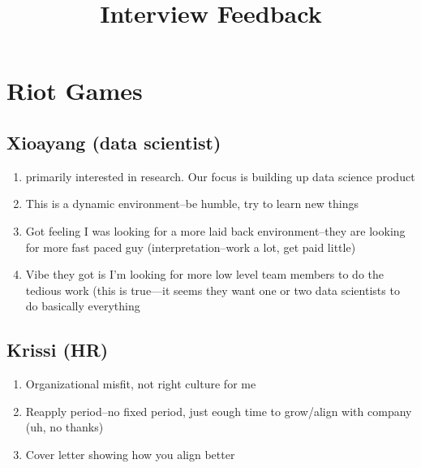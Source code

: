 \documentclass[12pt,reqno]{amsart}
\numberwithin{equation}{section}  %
\begin{document}
	\title{Interview Feedback}
	\author{}
	\address{}
	\date{}
	\maketitle
	\section{Riot Games}
	\subsection{Xioayang (data scientist)}
	\begin{enumerate}
		\item{} primarily interested in research. Our focus is building up data
			science product
		\item{}
			This is a dynamic environment--be humble, try to learn new things
		\item{}
			Got feeling I was looking for a more laid back environment--they are looking
			for more fast paced guy (interpretation--work a lot, get paid little)
		\item{}
			Vibe they got is I'm looking for more low level team members to do the
			tedious work (this is true---it seems they want one or two data scientists
			to do basically everything
	\end{enumerate}
	\subsection{Krissi (HR)}
	\begin{enumerate}
		\item{}
		Organizational misfit, not right culture for me
		\item{}
		Reapply period--no fixed period, just eough time to grow/align
		with company (uh, no thanks)
		\item{}
		Cover letter showing how you align better
	\end{enumerate}
	
\end{document}
